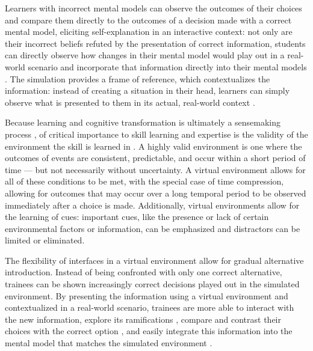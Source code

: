 Learners with incorrect mental models can observe the outcomes of their choices and compare them directly to the outcomes of a decision made with a correct mental model, eliciting self-explanation in an interactive context: not only are their incorrect beliefs refuted by the presentation of correct information, students can directly observe how changes in their mental model would play out in a real-world scenario and incorporate that information directly into their mental models \citep{Salzman1999}. The simulation provides a frame of reference, which contextualizes the information: instead of creating a situation in their head, learners can simply observe what is presented to them in its actual, real-world context \citep{Ericsson1993}.

Because learning and cognitive transformation is ultimately a sensemaking process \citep{Klein2006}, of critical importance to skill learning and expertise is the validity of the environment the skill is learned in \citep{Kahneman2009}. A highly valid environment is one where the outcomes of events are consistent, predictable, and occur within a short period of time — but not necessarily without uncertainty. A virtual environment allows for all of these conditions to be met, with the special case of time compression, allowing for outcomes that may occur over a long temporal period to be observed immediately after a choice is made. Additionally, virtual environments allow for the learning of cues: important cues, like the presence or lack of certain environmental factors or information, can be emphasized and distractors can be limited or eliminated.

The flexibility of interfaces in a virtual environment allow for gradual alternative introduction. Instead of being confronted with only one correct alternative, trainees can be shown increasingly correct decisions played out in the simulated environment. By presenting the information using a virtual environment and contextualized in a real-world scenario, trainees are more able to interact with the new information, explore its ramifications \citep{Ericsson1993, Patterson2010}, compare and contrast their choices with the correct option \citep{Fowlkes2009}, and easily integrate this information into the mental model that matches the simulated environment \citep{Salzman1999}.
